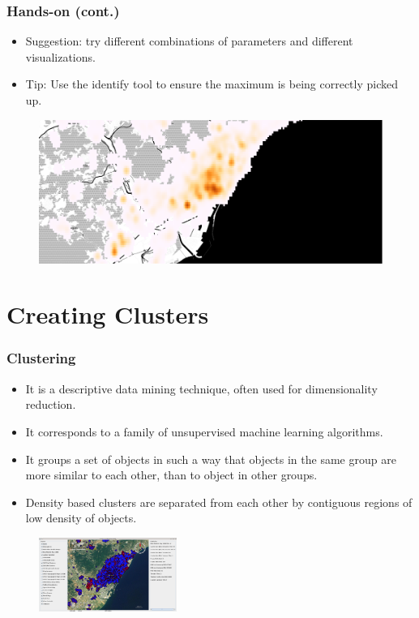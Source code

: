 \documentclass[hyperref={pdfpagelabels=true}]{beamer}
\begin{document}
\begin{frame}
\frametitle{Hands-on (cont.)}

\begin{itemize}  
    \item<1->Suggestion: try different combinations of parameters and different visualizations.    
    \item<1->Tip: Use the identify tool to ensure the maximum is being correctly picked up.
\end{itemize}  

  \begin{figure}  
      \includegraphics[width=\textwidth]{heatmap1.png}\\
    \end{figure}         

\end{frame}

\section{Creating Clusters} 
\begin{frame}
\frametitle{Clustering}
\small{ 
    \begin{itemize}
      \item<1->It is a descriptive data mining technique, often used for dimensionality reduction.
      \item<2->It corresponds to a family of unsupervised machine learning algorithms.      
      \item<3->It groups a set of objects in such a way that objects in the same group are more similar to each other, than to object in other groups.
      \item<4->Density based clusters are separated from each other by contiguous regions of low density of objects.
    \end{itemize}    
}
  \begin{figure}  
      \includegraphics[width=0.4\textwidth]{screenshot1.png}\\
    \end{figure}         
    
\end{frame}
\end{document}
